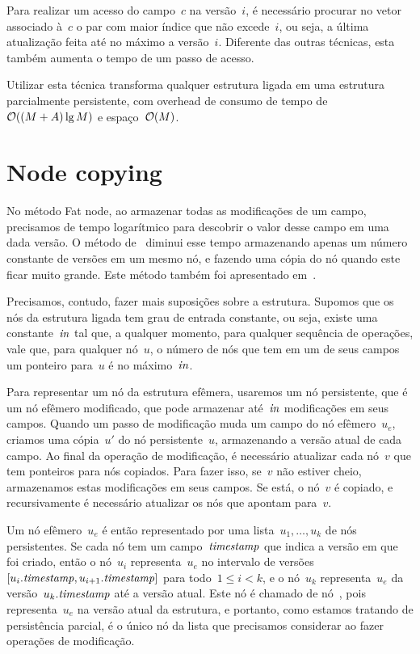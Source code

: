 \documentclass[../../main.tex]{subfiles}
\begin{document}
Para realizar um acesso do campo~$c$ na versão~$i$, é necessário procurar no vetor associado à~$c$ o par com maior índice que não excede~$i$, ou seja, a última atualização feita até no máximo a versão~$i$. Diferente das outras técnicas, esta também aumenta o tempo de um passo de acesso.

Utilizar esta técnica transforma qualquer estrutura ligada em uma estrutura parcialmente persistente, com overhead de consumo de tempo de~$\mathcal{O}((M+A) \lg{M})$ e espaço~$\mathcal{O}(M)$.

\section{Node copying} \label{sec:nodecopying}

No método Fat node, ao armazenar todas as modificações de um campo, precisamos de tempo logarítmico para descobrir o valor desse campo em uma dada versão. O método de~ diminui esse tempo armazenando apenas um número constante de versões em um mesmo nó, e fazendo uma cópia do nó quando este ficar muito grande. Este método também foi apresentado em~\cite{DriscollSST1989}.

Precisamos, contudo, fazer mais suposições sobre a estrutura. Supomos que os nós da estrutura ligada tem grau de entrada constante, ou seja, existe uma constante~$\mathit{in}$ tal que, a qualquer momento, para qualquer sequência de operações, vale que, para qualquer nó~$u$, o número de nós que tem em um de seus campos um ponteiro para~$u$ é no máximo~$\mathit{in}$.

Para representar um nó da estrutura efêmera, usaremos um nó persistente, que é um nó efêmero modificado, que pode armazenar até~$\mathit{in}$ modificações em seus campos. Quando um passo de modificação muda um campo do nó efêmero~$u_e$, criamos uma cópia~$u'$ do nó persistente~$u$, armazenando a versão atual de cada campo. Ao final da operação de modificação, é necessário atualizar cada nó~$v$ que tem ponteiros para nós copiados. Para fazer isso, se~$v$ não estiver cheio, armazenamos estas modificações em seus campos. Se está, o nó~$v$ é copiado, e recursivamente é necessário atualizar os nós que apontam para~$v$.

Um nó efêmero~$u_e$ é então representado por uma lista~$u_1, \ldots, u_k$ de nós persistentes. Se cada nó tem um campo~$\mathit{timestamp}$ que indica a versão em que foi criado, então o nó~$u_i$ representa~$u_e$ no intervalo de versões~$[u_i.\mathit{timestamp}, u_{i+1}.\mathit{timestamp}]$ para todo~$1 \leq i < k$, e o nó~$u_k$ representa~$u_e$ da versão~$u_k.\mathit{timestamp}$ até a versão atual. Este nó é chamado de nó~, pois representa~$u_e$ na versão atual da estrutura, e portanto, como estamos tratando de persistência parcial, é o único nó da lista que precisamos considerar ao fazer operações de modificação.
\end{document}
